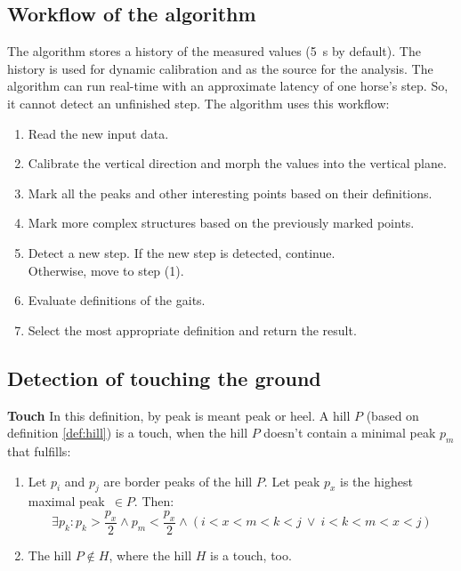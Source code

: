 \subsection{Workflow of the algorithm}
The algorithm stores a history of the measured values (\SI{5}{s} by default). The history is used for dynamic calibration and as the source for the analysis. The algorithm can run real-time with an approximate latency of one horse's step. So, it cannot detect an unfinished step. The algorithm uses this workflow:
\begin{enumerate}
    \item Read the new input data.
    \item Calibrate the vertical direction and morph the values into the vertical plane.
    \item Mark all the peaks and other interesting points based on their definitions.
    \item Mark more complex structures based on the previously marked points.
    \item Detect a new step. If the new step is detected, continue.\\Otherwise, move to step (1).
    \item Evaluate definitions of the gaits.
    \item Select the most appropriate definition and return the result.
\end{enumerate}

\subsection{Detection of touching the ground}
\begin{definition}{\textbf{Touch}}
    \label{def:touch}
    In this definition, by peak is meant peak or heel. A hill $P$ (based on definition \ref{def:hill}) is a touch, when the hill $P$ doesn't contain a minimal peak $p_m$ that fulfills:
    \begin{enumerate}
        \item Let $p_i$ and $p_j$ are border peaks of the hill $P$. Let peak $p_x$ is the highest maximal peak~$\in P$. Then:
        $$\exists p_k : p_k > \dfrac{p_x}{2} \land p_m < \dfrac{p_x}{2} \land (i < x < m < k < j \:\lor\: i < k < m < x < j)$$
        \item The hill $P \notin H$, where the hill $H$ is a touch, too.
    \end{enumerate}
\end{definition}

